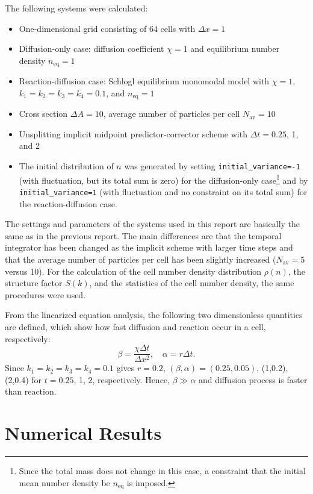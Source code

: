 \documentclass{article}
\begin{document}
The following systems were calculated:
\begin{itemize}
\item One-dimensional grid consisting of 64 cells with $\Delta x=1$
\item Diffusion-only case: diffusion coefficient $\chi=1$ and equilibrium number density $n_\mathrm{eq}=1$
\item Reaction-diffusion case: Schlogl equilibrium monomodal model with $\chi=1$, $k_1=k_2=k_3=k_4=0.1$, and $n_\mathrm{eq}=1$
\item Cross section $\Delta A=10$, average number of particles per cell $N_\mathrm{av}=10$
\item Unsplitting implicit midpoint predictor-corrector scheme with $\Delta t=0.25$, 1, and 2
\item The initial distribution of $n$ was generated by setting \texttt{initial\_variance=-1} (with fluctuation, but its total sum is zero) for the diffusion-only case\footnote{Since the total mass does not change in this case, a constraint that the initial mean number density be $n_\mathrm{eq}$ is imposed.} and by \texttt{initial\_variance=1} (with fluctuation and no constraint on its total sum) for the reaction-diffusion case.
\end{itemize}
The settings and parameters of the systems used in this report are basically the same as in the previous report.
The main differences are that the temporal integrator has been changed as the implicit scheme with larger time steps and that the average number of particles per cell has been slightly increased ($N_\mathrm{av}=5$ versus 10).
For the calculation of the cell number density distribution $\rho(n)$, the structure factor $S(k)$, and the statistics of the cell number density, the same procedures were used.

From the linearized equation analysis, the following two dimensionless quantities are defined, which show how fast diffusion and reaction occur in a cell, respectively:
\begin{equation}
\beta=\frac{\chi\Delta t}{\Delta x^2},\quad \alpha=r\Delta t.
\end{equation}
Since $k_1=k_2=k_3=k_4=0.1$ gives $r=0.2$, $(\beta,\alpha)=(0.25,0.05)$, (1,0.2), (2,0.4) for $t=0.25$, 1, 2, respectively.  
Hence, $\beta\gg\alpha$ and diffusion process is faster than reaction.

\section{Numerical Results}
\end{document}
